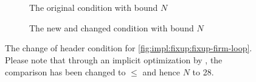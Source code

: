\begin{figure}[H]
    \begin{subfigure}[t]{0.5\textwidth}
        \centering
        \begin{adjustbox}{max width=0.49\textwidth}
            \centering
            
        \end{adjustbox}
        \caption{The original condition with bound $N$}
    \end{subfigure}
    \begin{subfigure}[t]{0.5\textwidth}
        \centering
        \begin{adjustbox}{max width=0.49\textwidth}
            \centering
            
        \end{adjustbox}
        \caption{The new and changed condition with bound $\hat{N}$}
    \end{subfigure}
    \caption{
    The change of header condition for \cref{fig:impl:fixup:fixup-firm-loop}.
    Please note that through an implicit optimization by \libFIRM{}, the comparison has been changed to $\leq$ and hence $N$ to 28.
    }
    \label{fig:impl:fixup:header-cond:firm}
\end{figure}